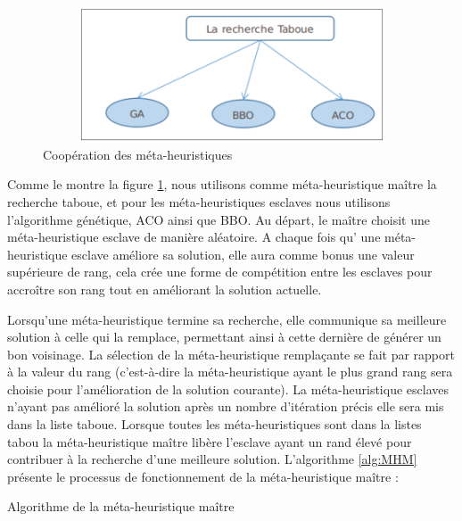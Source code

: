 \begin{figure}[H]
	\centering
	\includegraphics[width=13cm,height=4cm]{Chap4/3.png}
	\caption{Coopération des méta-heuristiques}
	\label{fig:CMH}
\end{figure}


Comme le montre la figure \ref{fig:CMH}, nous utilisons comme méta-heuristique maître la recherche taboue, et pour les méta-heuristiques esclaves nous utilisons l’algorithme génétique, ACO ainsi que BBO. Au départ, le maître choisit une méta-heuristique esclave de manière aléatoire. A chaque fois qu' une méta-heuristique esclave améliore sa solution, elle aura comme bonus une valeur supérieure de rang, cela crée une forme de compétition entre les esclaves pour accroître son rang tout en améliorant la solution actuelle.

Lorsqu'une méta-heuristique termine sa recherche, elle communique sa meilleure solution à celle qui la remplace, permettant ainsi à cette dernière de générer un bon voisinage. La sélection de la méta-heuristique remplaçante se fait par rapport à la valeur du rang (c’est-à-dire la méta-heuristique ayant le plus grand rang sera choisie pour l’amélioration de la solution courante). La méta-heuristique esclaves n’ayant pas amélioré la solution après un nombre d’itération  précis  elle sera mis dans la liste taboue. Lorsque toutes les méta-heuristiques sont dans la listes tabou la méta-heuristique maître libère l’esclave ayant un rand élevé pour contribuer à la recherche d’une meilleure solution. L'algorithme \ref{alg:MHM} présente le processus de fonctionnement de la méta-heuristique maître :


\begin{algorithm}[H]
\label{alg:MHM}
\caption{Algorithme de la méta-heuristique maître}
\SetAlgoLined
\DontPrintSemicolon

\end{algorithm}


